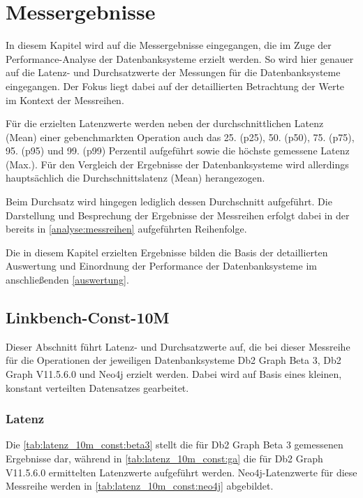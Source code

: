 \chapter{Messergebnisse}
\label{ergebnisse}

In diesem Kapitel wird auf die Messergebnisse eingegangen, die im Zuge der Per\-for\-mance-Analyse der Datenbanksysteme erzielt werden. So wird hier genauer auf die Latenz- und Durchsatzwerte der Messungen für die Datenbanksysteme eingegangen. Der Fokus liegt dabei auf der detaillierten Betrachtung der Werte im Kontext der Messreihen. 

Für die erzielten Latenzwerte werden neben der durchschnittlichen Latenz (Mean) einer gebenchmarkten Operation auch das 25. (p25), 50. (p50), 75. (p75), 95. (p95) und 99. (p99) Perzentil aufgeführt sowie die höchste gemessene Latenz (Max.). Für den Vergleich der Ergebnisse der Datenbanksysteme wird allerdings hauptsächlich die Durchschnittslatenz (Mean) herangezogen. 

Beim Durchsatz wird hingegen lediglich dessen Durchschnitt aufgeführt. Die Darstellung und Besprechung der Ergebnisse der Messreihen erfolgt dabei in der bereits in \autoref{analyse:messreihen} aufgeführten Reihenfolge. 

Die in diesem Kapitel erzielten Ergebnisse bilden die Basis der detaillierten Auswertung und Einordnung der Performance der Datenbanksysteme im anschließenden \autoref{auswertung}.

\section{Linkbench-Const-10M}
\label{ergebnisse:10m_const}
Dieser Abschnitt führt Latenz- und Durchsatzwerte auf, die bei dieser Messreihe für die Operationen der jeweiligen Datenbanksysteme Db2 Graph Beta 3, Db2 Graph V11.5.6.0 und Neo4j erzielt werden. Dabei wird auf Basis eines kleinen, konstant verteilten Datensatzes gearbeitet.

\subsection{Latenz}

Die \autoref{tab:latenz_10m_const:beta3} stellt die für Db2 Graph Beta 3 gemessenen Ergebnisse dar, während in \autoref{tab:latenz_10m_const:ga} die für Db2 Graph V11.5.6.0 ermittelten Latenzwerte aufgeführt werden. Neo4j-Latenzwerte für diese Messreihe werden in \autoref{tab:latenz_10m_const:neo4j} abgebildet.

